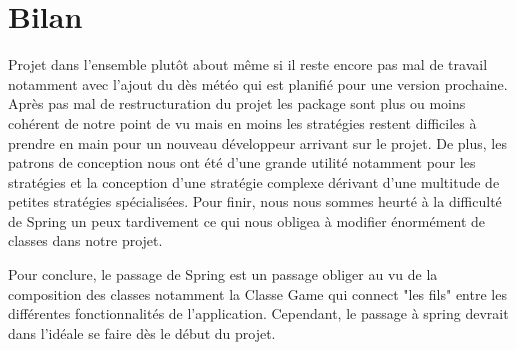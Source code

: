 \chapter{Bilan}

Projet dans l'ensemble plutôt about même si il  reste encore pas mal de travail notamment avec l'ajout du dès météo qui est planifié pour une version prochaine. Après pas mal de restructuration du projet les package sont plus ou moins cohérent de notre point de vu mais en moins les stratégies restent difficiles à prendre en main pour un nouveau développeur arrivant sur le projet. De plus, les patrons de conception nous ont été d'une grande utilité notamment pour les stratégies et la conception d'une stratégie complexe dérivant d'une multitude de petites stratégies spécialisées. Pour finir, nous nous sommes heurté à la difficulté de Spring un peux tardivement ce qui nous obligea à modifier énormément de classes dans notre projet.


Pour conclure, le passage de Spring est un passage obliger au vu de la composition des classes notamment la Classe Game qui connect "les fils" entre les différentes fonctionnalités de l'application. Cependant, le passage à spring devrait dans l'idéale se faire dès le début du projet.
